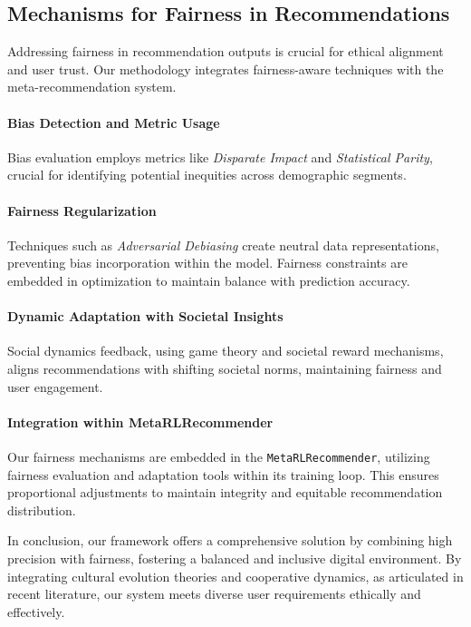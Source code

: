 \subsection{Mechanisms for Fairness in Recommendations}

Addressing fairness in recommendation outputs is crucial for ethical alignment and user trust. Our methodology integrates fairness-aware techniques with the meta-recommendation system.

\paragraph{Bias Detection and Metric Usage}
Bias evaluation employs metrics like \emph{Disparate Impact} and \emph{Statistical Parity}, crucial for identifying potential inequities across demographic segments.

\paragraph{Fairness Regularization}
Techniques such as \emph{Adversarial Debiasing} create neutral data representations, preventing bias incorporation within the model. Fairness constraints are embedded in optimization to maintain balance with prediction accuracy.

\paragraph{Dynamic Adaptation with Societal Insights}
Social dynamics feedback, using game theory and societal reward mechanisms, aligns recommendations with shifting societal norms, maintaining fairness and user engagement.

\paragraph{Integration within MetaRLRecommender}
Our fairness mechanisms are embedded in the \texttt{MetaRLRecommender}, utilizing fairness evaluation and adaptation tools within its training loop. This ensures proportional adjustments to maintain integrity and equitable recommendation distribution.

In conclusion, our framework offers a comprehensive solution by combining high precision with fairness, fostering a balanced and inclusive digital environment. By integrating cultural evolution theories and cooperative dynamics, as articulated in recent literature, our system meets diverse user requirements ethically and effectively.
